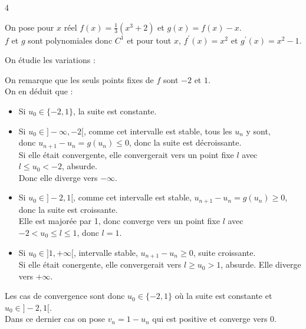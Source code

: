 \begin{correction}{4}

    On pose pour $x$ réel $f(x)=\frac{1}{3}(x^{3}+2)$ et $g(x)=f(x)-x$. \\
    $f$ et $g$ sont polynomiales donc $C^{1}$ et pour tout $x$, $f^{\prime}(x)=x^{2}$ et $g^{\prime}(x)=x^{2}-1$.

    On étudie les variations :

   
    On remarque que les seuls points fixes de $f$ sont $-2$ et $1$. \\
    On en déduit que :
    \begin{itemize}
        \item Si $u_{0}\in\{-2,1\}$, la suite est constante.
        \item Si $u_{0}\in]-\infty,-2[$, comme cet intervalle est stable, tous les $u_{n}$ y sont, \\
            donc $u_{n+1}-u_{n}=g(u_{n})\leqslant0$, donc la suite est décroissante. \\
            Si elle était convergente, elle convergerait vers un point fixe $l$ avec $l\leqslant u_{0}<-2$, absurde. \\
            Donc elle diverge vers $-\infty$.
        \item Si $u_{0}\in]-2,1[$, comme cet intervalle est stable, $u_{n+1}-u_{n}=g(u_{n})\geqslant0$,
            donc la suite est croissante. \\
            Elle est majorée par 1, donc converge vers un point fixe $l$ avec $-2<u_{0}\leqslant l\leqslant1$, donc $l=1$.
        \item Si $u_{0}\in]1,+\infty[$, intervalle stable, $u_{n+1}-u_{n}\geqslant0$, suite croissante. \\
            Si elle était conergente, elle convergerait vers $l \geqslant u_0 > 1$, absurde. Elle diverge vers $+\infty$.
    \end{itemize}
    Les cas de convergence sont donc $u_{0}\in\{-2,1\}$ où la suite est constante et $u_{0}\in]-2,1[$. \\
    Dans ce dernier cas on pose $v_{n}=1-u_{n}$ qui est positive et converge vers 0.
    

\end{correction}
